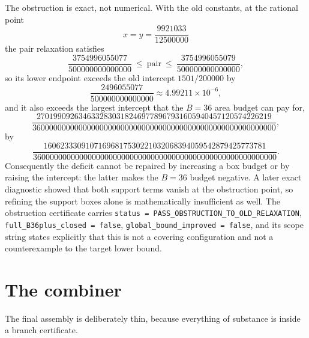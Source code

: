 The obstruction is exact, not numerical. With the old constants, at the rational point
\[
x=y=\frac{9921033}{12500000}
\]
the pair relaxation satisfies
\[
\frac{3754996055077}{500000000000000}\ \le\ \text{pair}\ \le\ \frac{3754996055079}{500000000000000},
\]
so its lower endpoint exceeds the old intercept $1501/200000$ by
\[
\frac{2496055077}{500000000000000}\approx4.99211\times10^{-6},
\]
and it also exceeds the largest intercept that the $B=36$ area budget can pay for,
\[
\frac{27019909263463328303182469778967931605940457120574226219}
{3600000000000000000000000000000000000000000000000000000000},
\]
by
\[
\frac{16062333091071696817530221032068394059542879425773781}
{3600000000000000000000000000000000000000000000000000000000}.
\]
Consequently the deficit cannot be repaired by increasing a box budget or by raising the intercept:
the latter makes the $B=36$ budget negative. A later exact diagnostic showed that both support terms
vanish at the obstruction point, so refining the support boxes alone is mathematically insufficient
as well. The obstruction certificate carries
\texttt{status = PASS\_\allowbreak{}OBSTRUCTION\_\allowbreak{}TO\_\allowbreak{}OLD\_\allowbreak{}RELAXATION},
\texttt{full\_\allowbreak{}B36plus\_\allowbreak{}closed = false}, \texttt{global\_\allowbreak{}bound\_\allowbreak{}improved = false}, and its scope
string states explicitly that this is not a covering configuration and not a counterexample to the
target lower bound.

\section{The combiner}

The final assembly is deliberately thin, because everything of substance is inside a branch
certificate.

